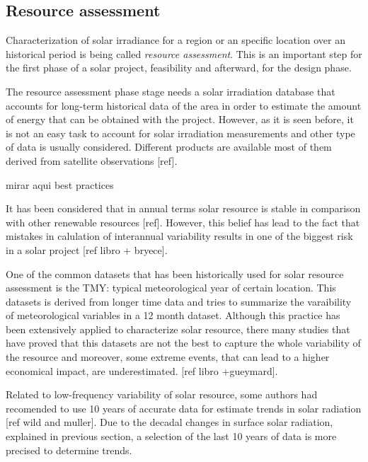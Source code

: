 \subsection{Resource assessment}

Characterization of solar irradiance for a region or an specific location over an historical period is being called \textit{resource assessment}. This is an important step for the first phase of a solar project, feasibility and afterward, for the design phase. 

The resource assessment phase stage needs a solar irradiation database that accounts for long-term historical data of the area in order to estimate the amount of energy that can be obtained with the project. However, as it is seen before, it is not an easy task to account for solar irradiation measurements and other type of data is usually considered. Different products are available most of them derived from satellite observations [ref].

{\color{red} mirar aqui best practices}

It has been considered that in annual terms solar resource is stable in comparison with other renewable resources [ref]. However, this belief has lead to the fact that mistakes in calulation of interannual variability results in one of the biggest risk in a solar project [ref libro + bryece].

One of the common datasets that has been historically used for solar resource assessment is the TMY: typical meteorological year of certain location. This datasets is derived from longer time data and tries to summarize the varaibility of meteorological variables in a 12 month dataset. Although this practice has been extensively applied to characterize solar resource, there many studies that have proved that this datasets are not the best to capture the whole variability of the resource and moreover, some extreme events, that can lead to a higher economical impact, are underestimated. [ref libro +gueymard].

Related to low-frequency variability of solar resource, some authors had recomended to use 10 years of accurate data for estimate trends in solar radiation [ref wild and muller]. Due to the decadal changes in surface solar radiation, explained in previous section, a selection of the last 10 years of data is more precised to determine trends. %

